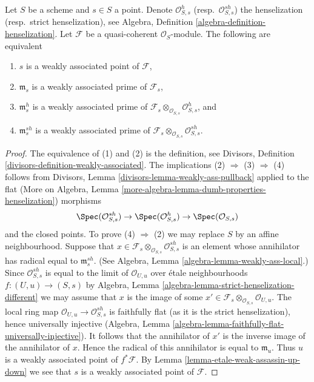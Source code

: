\begin{lemma}
\label{lemma-weakly-associated-henselization}
Let $S$ be a scheme and $s \in S$ a point. Denote $\mathcal{O}_{S, s}^h$
(resp.\ $\mathcal{O}_{S, s}^{sh}$) the henselization (resp.\ strict
henselization), see
Algebra, Definition \ref{algebra-definition-henselization}.
Let $\mathcal{F}$ be a quasi-coherent $\mathcal{O}_S$-module.
The following are equivalent
\begin{enumerate}
\item $s$ is a weakly associated point of $\mathcal{F}$,
\item $\mathfrak m_s$ is a weakly associated prime of $\mathcal{F}_s$,
\item $\mathfrak m_s^h$ is a weakly associated prime of
$\mathcal{F}_s \otimes_{\mathcal{O}_{S, s}} \mathcal{O}_{S, s}^h$, and
\item $\mathfrak m_s^{sh}$ is a weakly associated prime of
$\mathcal{F}_s \otimes_{\mathcal{O}_{S, s}} \mathcal{O}_{S, s}^{sh}$.
\end{enumerate}
\end{lemma}

\begin{proof}
The equivalence of (1) and (2) is the definition, see
Divisors, Definition \ref{divisors-definition-weakly-associated}.
The implications (2) $\Rightarrow$ (3) $\Rightarrow$ (4)
follows from Divisors, Lemma \ref{divisors-lemma-weakly-ass-pullback}
applied to the flat (More on Algebra, Lemma
\ref{more-algebra-lemma-dumb-properties-henselization})
morphisms
$$
\Spec(\mathcal{O}_{S, s}^{sh}) \to
\Spec(\mathcal{O}_{S, s}^h) \to
\Spec(\mathcal{O}_{S, s})
$$
and the closed points. To prove (4) $\Rightarrow$ (2) we may replace
$S$ by an affine neighbourhood. Suppose that
$x \in \mathcal{F}_s \otimes_{\mathcal{O}_{S, s}} \mathcal{O}_{S, s}^{sh}$
is an element whose annihilator has radical equal to $\mathfrak m_s^{sh}$.
(See Algebra, Lemma \ref{algebra-lemma-weakly-ass-local}.)
Since $\mathcal{O}_{S, s}^{sh}$ is equal to the limit
of $\mathcal{O}_{U, u}$ over \'etale neighbourhoods
$f : (U, u) \to (S, s)$ by Algebra, Lemma
\ref{algebra-lemma-strict-henselization-different}
we may assume that $x$ is the image of some
$x' \in \mathcal{F}_s \otimes_{\mathcal{O}_{S, s}} \mathcal{O}_{U, u}$.
The local ring map $\mathcal{O}_{U, u} \to \mathcal{O}_{S, s}^{sh}$
is faithfully flat (as it is the strict henselization), hence
universally injective
(Algebra, Lemma \ref{algebra-lemma-faithfully-flat-universally-injective}).
It follows that the annihilator of $x'$ is the inverse image of the
annihilator of $x$. Hence the radical of this annihilator
is equal to $\mathfrak m_u$.
Thus $u$ is a weakly associated point of $f^*\mathcal{F}$.
By Lemma \ref{lemma-etale-weak-assassin-up-down}
we see that $s$ is a weakly associated point of $\mathcal{F}$.
\end{proof}





